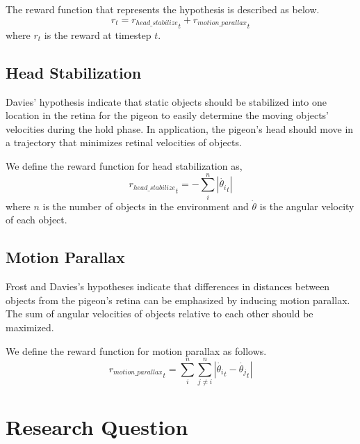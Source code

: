   The reward function that represents the hypothesis is described as below.
  \begin{equation}
    r_t = {r_{head\_stabilize}}_t + {r_{motion\_parallax}}_t
  \end{equation}
  where $r_t$ is the reward at timestep $t$.

  \subsection{Head Stabilization}
    Davies' hypothesis indicate that static objects should be stabilized into one location in the retina for the pigeon to easily determine the moving objects' velocities during the hold phase. In application, the pigeon's head should move in a trajectory that minimizes retinal velocities of objects.

    We define the reward function for head stabilization as,
    \begin{equation}
      {r_{head\_stabilize}}_t = - \sum_i^n |\dot {\theta_i}_t|
    \end{equation}
    where $n$ is the number of objects in the environment and $\dot \theta$ is the angular velocity of each object.

  \subsection{Motion Parallax}
    Frost and Davies's hypotheses indicate that differences in distances between objects from the pigeon's retina can be emphasized by inducing motion parallax.
    The sum of angular velocities of objects relative to each other should be maximized.

    We define the reward function for motion parallax as follows.
    \begin{equation}
      {r_{motion\_parallax}}_t = \sum_i^n \sum_{j \ne i}^n |\dot {\theta_i}_t - \dot {\theta_j}_t|
    \end{equation}

\section{Research Question}
